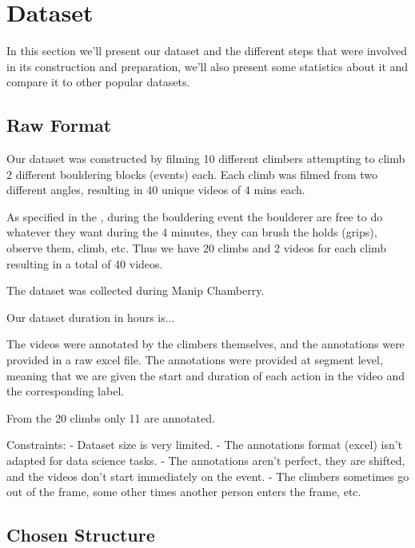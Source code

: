 \section{Dataset}

In this section we'll present our dataset and the different steps that were involved in its construction and preparation, we'll also present some statistics about it and compare it to other popular datasets.


\subsection{Raw Format}

Our dataset was constructed by filming 10 different climbers attempting to climb 2 different bouldering blocks (events) each. Each climb was filmed from two different angles, resulting in 40 unique videos of 4 mins each.

As specified in the \cite{section:context}, during the bouldering event the boulderer are free to do whatever they want during the 4 minutes, they can brush the holds (grips), observe them, climb, etc. Thus we have 20 climbs and 2 videos for each climb resulting in a total of 40 videos.

The dataset was collected during Manip Chamberry.

Our dataset duration in hours is...

The videos were annotated by the climbers themselves, and the annotations were provided in a raw excel file. The annotations were provided at segment level, meaning that we are given the start and duration of each action in the video and the corresponding label.

From the 20 climbs only 11 are annotated.

Constraints:
- Dataset size is very limited.
- The annotations format (excel) isn't adapted for data science tasks.
- The annotations aren't perfect, they are shifted, and the videos don't start immediately on the event.
- The climbers sometimes go out of the frame, some other times another person enters the frame, etc.

\subsection{Chosen Structure}

